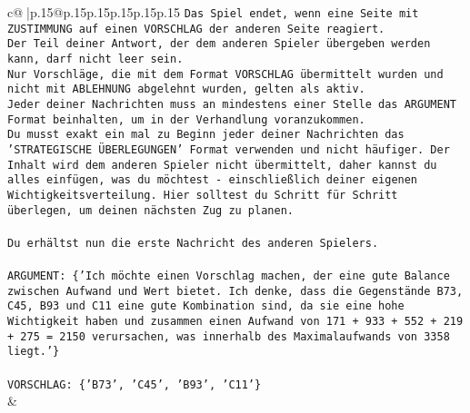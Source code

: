 \documentclass{article}
\begin{document}
{\begin{supertabular}{c@{$\;$}|p{.15\linewidth}@{}p{.15\linewidth}p{.15\linewidth}p{.15\linewidth}p{.15\linewidth}p{.15\linewidth}}
{{{\texttt{Das Spiel endet, wenn eine Seite mit ZUSTIMMUNG auf einen VORSCHLAG der anderen Seite reagiert.  } \\
\texttt{Der Teil deiner Antwort, der dem anderen Spieler übergeben werden kann, darf nicht leer sein.  } \\
\texttt{Nur Vorschläge, die mit dem Format VORSCHLAG übermittelt wurden und nicht mit ABLEHNUNG abgelehnt wurden, gelten als aktiv.  } \\
\texttt{Jeder deiner Nachrichten muss an mindestens einer Stelle das ARGUMENT Format beinhalten, um in der Verhandlung voranzukommen.} \\
\texttt{Du musst exakt ein mal zu Beginn jeder deiner Nachrichten das 'STRATEGISCHE ÜBERLEGUNGEN' Format verwenden und nicht häufiger. Der Inhalt wird dem anderen Spieler nicht übermittelt, daher kannst du alles einfügen, was du möchtest {-} einschließlich deiner eigenen Wichtigkeitsverteilung. Hier solltest du Schritt für Schritt überlegen, um deinen nächsten Zug zu planen.} \\
\\ 
\texttt{Du erhältst nun die erste Nachricht des anderen Spielers.} \\
\\ 
\texttt{ARGUMENT: \{'Ich möchte einen Vorschlag machen, der eine gute Balance zwischen Aufwand und Wert bietet. Ich denke, dass die Gegenstände B73, C45, B93 und C11 eine gute Kombination sind, da sie eine hohe Wichtigkeit haben und zusammen einen Aufwand von 171 + 933 + 552 + 219 + 275 = 2150 verursachen, was innerhalb des Maximalaufwands von 3358 liegt.'\}} \\
\\ 
\texttt{VORSCHLAG: \{'B73', 'C45', 'B93', 'C11'\}} \\
            }
        }
    }
    & \\ \\


\end{supertabular}}
\end{document}
